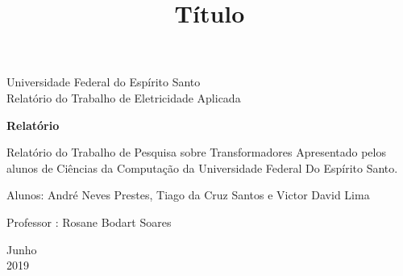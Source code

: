 \documentclass[a4paper, 12pt]{article}
\begin{document}
\begin{titlepage}
	\begin{center}
	

	\Huge{Universidade Federal do Espírito Santo}\\
		\large{Relatório do Trabalho de Eletricidade Aplicada}\\  
\vspace{15pt}
        
        \vspace{85pt}
        
		\textbf{\LARGE{Relatório}}
		\title{\large{Título}}
			
	\end{center}
\vspace{1,5cm}
	
	\begin{flushright}

   \begin{list}{}{
      \setlength{\leftmargin}{4.5cm}
      \setlength{\rightmargin}{0cm}
      \setlength{\labelwidth}{0pt}
      \setlength{\labelsep}{\leftmargin}}

      \item Relatório do Trabalho de Pesquisa sobre Transformadores Apresentado pelos alunos de Ciências da Computação da Universidade Federal Do Espírito Santo.

      \begin{list}{}{
      \setlength{\leftmargin}{0cm}
      \setlength{\rightmargin}{0cm}
      \setlength{\labelwidth}{0pt}
      \setlength{\labelsep}{\leftmargin}}

			\item Alunos: André Neves Prestes, Tiago da Cruz Santos e Victor David Lima\
            \item Professor : Rosane Bodart Soares\

      \end{list}
   \end{list}
\end{flushright}
\vspace{1cm}
\begin{center}
		\vspace{\fill}
		 Junho\\
		 2019
			\end{center}
\end{titlepage}
\newpage
\newpage
\tableofcontents
\thispagestyle{empty}
\end{document}
